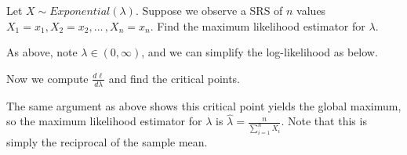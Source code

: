 \begin{examp}
Let $X \sim Exponential(\lambda)$. Suppose we observe a SRS of $n$ values $X_1 = x_1, X_2 = x_2, \dots \,, X_n = x_n$. Find the maximum likelihood estimator for $\lambda$.
\par
\noindent As above, note $\lambda \in (0,\infty)$, and we can simplify the log-likelihood as below.
\par
\noindent Now we compute $\frac{d\ell}{d\lambda}$ and find the critical points.
\par
\noindent The same argument as above shows this critical point yields the global maximum, so the maximum likelihood estimator for $\lambda$ is $\widehat{\lambda} = \frac{n}{\sum_{i=1}^{n} X_i}$. Note that this is simply the reciprocal of the sample mean.
\end{examp}

